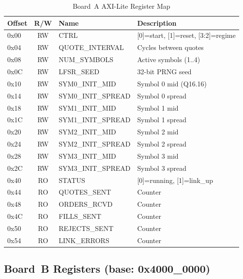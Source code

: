 \documentclass[conference]{IEEEtran}
\begin{document}
\begin{table}[h]
\centering
\caption{Board~A AXI-Lite Register Map}
\label{tab:rega}
\begin{tabular}{@{}lclL{2.8cm}@{}}
\toprule
\textbf{Offset} & \textbf{R/W} & \textbf{Name} & \textbf{Description} \\
\midrule
0x00 & RW & CTRL & [0]=start, [1]=reset, [3:2]=regime \\
0x04 & RW & QUOTE\_INTERVAL & Cycles between quotes \\
0x08 & RW & NUM\_SYMBOLS & Active symbols (1..4) \\
0x0C & RW & LFSR\_SEED & 32-bit PRNG seed \\
0x10 & RW & SYM0\_INIT\_MID & Symbol 0 mid (Q16.16) \\
0x14 & RW & SYM0\_INIT\_SPREAD & Symbol 0 spread \\
0x18 & RW & SYM1\_INIT\_MID & Symbol 1 mid \\
0x1C & RW & SYM1\_INIT\_SPREAD & Symbol 1 spread \\
0x20 & RW & SYM2\_INIT\_MID & Symbol 2 mid \\
0x24 & RW & SYM2\_INIT\_SPREAD & Symbol 2 spread \\
0x28 & RW & SYM3\_INIT\_MID & Symbol 3 mid \\
0x2C & RW & SYM3\_INIT\_SPREAD & Symbol 3 spread \\
0x40 & RO & STATUS & [0]=running, [1]=link\_up \\
0x44 & RO & QUOTES\_SENT & Counter \\
0x48 & RO & ORDERS\_RCVD & Counter \\
0x4C & RO & FILLS\_SENT & Counter \\
0x50 & RO & REJECTS\_SENT & Counter \\
0x54 & RO & LINK\_ERRORS & Counter \\
\bottomrule
\end{tabular}
\end{table}

\subsection{Board~B Registers (base: 0x4000\_0000)}
\end{document}
